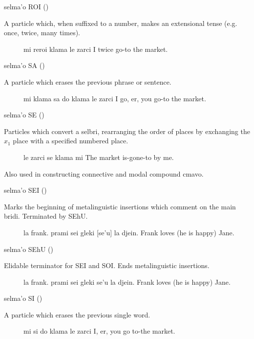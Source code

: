 selma'o ROI () 

A particle which, when suffixed to a number, makes an
    extensional tense (e.g. once, twice, many times).
\begin{description}
\item[] mi reroi klama le zarci I twice go-to the market.
\end{description}

selma'o SA () 

A particle which erases the previous phrase or sentence.
\begin{description}
\item[] mi klama sa do klama le zarci I go, er, you go-to the market.
\end{description}

selma'o SE () 

Particles which convert a selbri, rearranging the order of
    places by exchanging the $x_1$ place with a specified numbered
    place.
\begin{description}
\item[] le zarci se klama mi The market is-gone-to by me.

\end{description}

Also used in constructing connective and modal compound
    cmavo.

selma'o SEI ()

Marks the beginning of metalinguistic insertions which
    comment on the main bridi. Terminated by SEhU.
\begin{description}
\item[] la frank. prami sei gleki [se'u] la djein. Frank loves (he is happy) Jane.
\end{description}

selma'o SEhU () 

Elidable terminator for SEI and SOI. Ends metalinguistic
    insertions.
\begin{description}
\item[] la frank. prami sei gleki se'u la djein. Frank loves (he is happy) Jane.
\end{description}

selma'o SI () 

A particle which erases the previous single word.
\begin{description}
\item[] mi si do klama le zarci I, er, you go to-the market.
\end{description}

